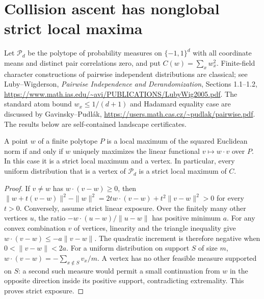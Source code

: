 \section{Collision ascent has nonglobal strict local maxima}
\label{s13:sec:attainment-traps}
Let $\mathcal P_d$ be the polytope of probability measures on
$\{-1,1\}^d$ with all coordinate means and distinct pair correlations
zero, and put $C(w)=\sum_xw_x^2$. Finite-field character constructions
of pairwise independent distributions are classical; see Luby--Wigderson,
\emph{Pairwise Independence and Derandomization}, Sections 1.1--1.2,
\url{https://www.math.ias.edu/~avi/PUBLICATIONS/LubyWig2005.pdf}.
The standard atom bound $w_x\le1/(d+1)$ and Hadamard equality case
are discussed by Gavinsky--Pudl\'ak,
\url{https://users.math.cas.cz/~pudlak/pairwise.pdf}.
The results below are self-contained landscape certificates.

\begin{lemma}\label{s13:lem:attainment-criterion}
A point $w$ of a finite polytope $P$ is a local maximum of the squared
Euclidean norm if and only if $w$ uniquely maximizes the linear
functional $v\mapsto w\cdot v$ over $P$. In this case it is a strict
local maximum and a vertex. In particular, every uniform distribution
that is a vertex of $\mathcal P_d$ is a strict local maximum of $C$.
\end{lemma}
\begin{proof}
If $v\ne w$ has $w\cdot(v-w)\ge0$, then
$\|w+t(v-w)\|^2-\|w\|^2=2t w\cdot(v-w)+t^2\|v-w\|^2>0$
for every $t>0$. Conversely, assume strict linear exposure. Over the
finitely many other vertices $u$, the ratio
$-w\cdot(u-w)/\|u-w\|$ has positive minimum $a$. For any convex
combination $v$ of vertices, linearity and the triangle inequality give
$w\cdot(v-w)\le-a\|v-w\|$. The quadratic increment is therefore
negative when $0<\|v-w\|<2a$.
For a uniform distribution on support $S$ of size $m$,
$w\cdot(v-w)=-\sum_{x\notin S}v_x/m$. A vertex has no other feasible
measure supported on $S$: a second such measure would permit a small
continuation from $w$ in the opposite direction inside its positive
support, contradicting extremality. This proves strict exposure.
\end{proof}

